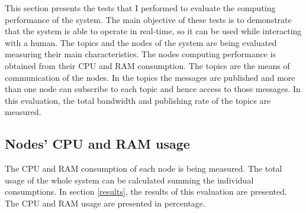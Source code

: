	This section presents the tests that I performed to evaluate the computing performance of the system. 
	The main objective of these tests is to demonstrate that the system is able to operate in real-time, so it can be used while interacting with a human.
	The topics and the nodes of the system are being evaluated measuring their main characteristics. 
	The nodes computing performance is obtained from their CPU and RAM consumption. 
	The topics are the means of communication of the nodes. 
	In the topics the messages are published and more than one node can subscribe to each topic and hence access to those messages. 
	In this evaluation, the total bandwidth and publishing rate of the topics are measured. 

		\subsection{Nodes' CPU and RAM usage}

		The CPU and RAM consumption of each node is being measured. 
		The total usage of the whole system can be calculated summing the individual consumptions. 
		In section \ref{results}, the results of this evaluation are presented. 
		The CPU and RAM usage are presented in percentage. 



